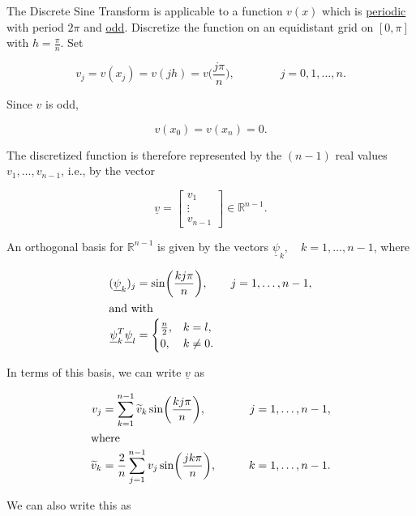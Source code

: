 \documentclass[11pt]{article}
\begin{document}
The Discrete Sine Transform is applicable to a function $v(x)$ which is \underline{periodic} with period $2 \pi$ and \underline{odd}. Discretize the function on an equidistant grid on $[0,\pi]$ with $h=\frac{\pi}{n}$. Set

\begin{equation*}
  v_j = v(x_j) = v(jh) = v \biggl(\frac{j \pi}{n} \biggr), \qquad \qquad j=0,1,\ldots,n.
\end{equation*}

Since $v$ is odd,

\begin{equation*}
  v(x_0) = v(x_n) = 0.
\end{equation*}

The discretized function is therefore represented by the $(n-1)$ real values $v_1,\ldots,v_{n-1}$, i.e., by the vector

\begin{equation*}
  \underline{v} = 
  \begin{bmatrix}
    v_1 \\
    \vdots \\
    v_{n-1}
  \end{bmatrix}
  \in \mathbb{R}^{n-1}.
\end{equation*}

An orthogonal basis for $\mathbb{R}^{n-1}$ is given by the vectors $\underline{\psi}_k, \quad k=1,\ldots,n-1$, where

\begin{align*}
  (\underline{\psi}_k)_j &= \sin \biggl( \frac{k j \pi}{n} \biggr), \qquad j=1,\ldots,n-1, \\
  \intertext{and with}
  \underline{\psi}_k^T \underline{\psi}_l &=
  \begin{cases}
    \frac{n}{2}, & k=l, \\
    0, & k \not= 0.
  \end{cases}
\end{align*}

In terms of this basis, we can write $\underline{v}$ as

\begin{alignat*}{2}
  v_j &= \sum_{k=1}^{n-1} \widetilde{v}_k \sin \biggl( \frac{k j \pi}{n} \biggr), &\qquad j&=1,\ldots,n-1, \\
  \intertext{where}
  \widetilde{v}_k &= \frac{2}{n} \sum_{j=1}^{n-1} v_j \sin \biggl( \frac{j k \pi}{n} \biggr), &\qquad  k&=1,\ldots,n-1.
\end{alignat*}

We can also write this as
\end{document}
